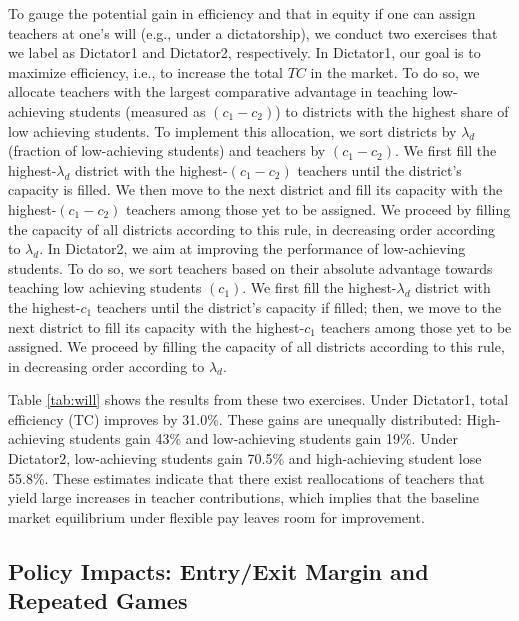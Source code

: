 \documentclass[notitlepage,12pt]{article}%
\begin{document}
To gauge the potential gain in efficiency and that in equity if one can assign
teachers at one's will (e.g., under a dictatorship), we conduct two exercises
that we label as Dictator1 and Dictator2, respectively. \newline In Dictator1,
our goal is to maximize efficiency, i.e., to increase the total $TC$ in the
market. To do so, we allocate teachers with the largest comparative advantage
in teaching low-achieving students (measured as $(c_{1}-c_{2})$) to districts
with the highest share of low achieving students. To implement this
allocation, we sort districts by $\lambda_{d}$ (fraction of low-achieving
students) and teachers by $(c_{1}-c_{2})$. We first fill the highest-$\lambda
_{d}$ district with the highest-$\left(  c_{1}-c_{2}\right)  $ teachers until
the district's capacity is filled. We then move to the next district and fill
its capacity with the highest-$\left(  c_{1}-c_{2}\right)  $ teachers among
those yet to be assigned. We proceed by filling the capacity of all districts
according to this rule, in decreasing order according to $\lambda_{d}$.
\newline In Dictator2, we aim at improving the performance of low-achieving
students. To do so, we sort teachers based on their absolute advantage towards
teaching low achieving students $\left(  c_{1}\right)  $. We first fill the
highest-$\lambda_{d}$ district with the highest-$c_{1}$ teachers until the
district's capacity if filled; then, we move to the next district to fill its
capacity with the highest-$c_{1}$ teachers among those yet to be assigned. We
proceed by filling the capacity of all districts according to this rule, in
decreasing order according to $\lambda_{d}$.

Table \ref{tab:will} shows the results from these two exercises. Under
Dictator1, total efficiency (TC) improves by 31.0\%. These gains are unequally
distributed: High-achieving students gain 43\% and low-achieving students gain
19\%. Under Dictator2, low-achieving students gain 70.5\% and high-achieving
student lose 55.8\%. These estimates indicate that there exist reallocations
of teachers that yield large increases in teacher contributions, which implies
that the baseline market equilibrium under flexible pay leaves room for improvement.

\subsection{Policy Impacts: Entry/Exit Margin and Repeated Games}
\end{document}
